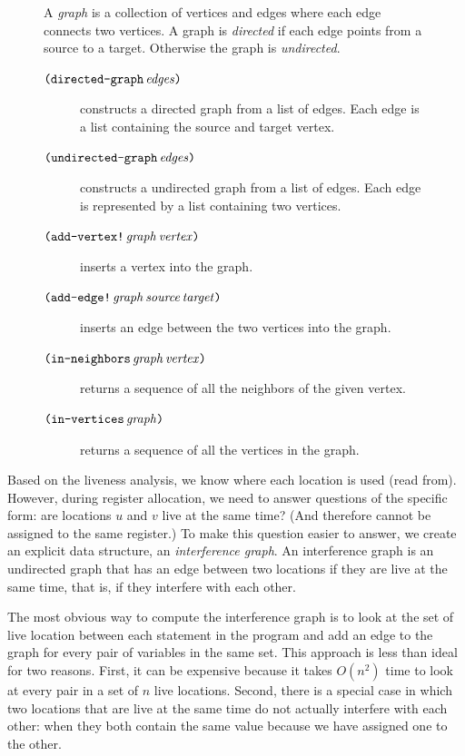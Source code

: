 \documentclass[11pt]{book}
\begin{document}
\begin{figure}
  \small
  \begin{tcolorbox}[title=\href{https://docs.racket-lang.org/graph/index.html}{The Racket Graph Library}]
    A \emph{graph} is a collection of vertices and edges where each
    edge connects two vertices.  A graph is \emph{directed} if each
    edge points from a source to a target.  Otherwise the graph is
    \emph{undirected}.
  \begin{description}
  \item[$\texttt{(}\texttt{directed-graph}\,\mathit{edges}\texttt{)}$] constructs a
    directed graph from a list of edges. Each edge is a list
    containing the source and target vertex.
  \item[$\texttt{(}\texttt{undirected-graph}\,\mathit{edges}\texttt{)}$] constructs a
    undirected graph from a list of edges. Each edge is represented by
    a list containing two vertices.
  \item[$\texttt{(}\texttt{add-vertex!}\,\mathit{graph}\,\mathit{vertex}\texttt{)}$]
    inserts a vertex into the graph.
  \item[$\texttt{(}\texttt{add-edge!}\,\mathit{graph}\,\mathit{source}\,\mathit{target}\texttt{)}$]
    inserts an edge between the two vertices into the graph.
  \item[$\texttt{(}\texttt{in-neighbors}\,\mathit{graph}\,\mathit{vertex}\texttt{)}$]
    returns a sequence of all the neighbors of the given vertex.
  \item[$\texttt{(}\texttt{in-vertices}\,\mathit{graph}\texttt{)}$]
    returns a sequence of all the vertices in the graph.
  \end{description}
\end{tcolorbox}
\end{figure}

Based on the liveness analysis, we know where each location is used
(read from).  However, during register allocation, we need to answer
questions of the specific form: are locations $u$ and $v$ live at the
same time?  (And therefore cannot be assigned to the same register.)
To make this question easier to answer, we create an explicit data
structure, an \emph{interference graph}.  An
interference graph is an undirected graph that has an edge between two
locations if they are live at the same time, that is, if they
interfere with each other.

The most obvious way to compute the interference graph is to look at
the set of live location between each statement in the program and add
an edge to the graph for every pair of variables in the same set.
This approach is less than ideal for two reasons. First, it can be
expensive because it takes $O(n^2)$ time to look at every pair in a
set of $n$ live locations. Second, there is a special case in which
two locations that are live at the same time do not actually interfere
with each other: when they both contain the same value because we have
assigned one to the other.
\end{document}
